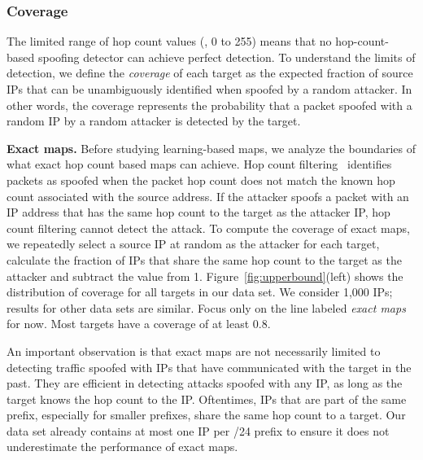 \subsubsection{Coverage}

The limited range of hop count values (\ie{}, 0 to 255) means that no hop-count-based spoofing detector can achieve perfect detection. To understand the limits of detection, we define the {\em coverage} of each target as the expected fraction of source IPs that can be unambiguously identified when spoofed by a random attacker. In other words, the coverage represents the probability that a packet spoofed with a random IP by a random attacker is detected by the target.

{\bf Exact maps.} Before studying learning-based maps, we analyze the boundaries of what exact hop count based maps can achieve. Hop count filtering~\citep{hcf} identifies packets as spoofed when the packet hop count does not match the known hop count associated with the source address. If the attacker spoofs a packet with an IP address that has the same hop count to the target as the attacker IP, hop count filtering cannot detect the attack. 
%
To compute the coverage of exact maps, we repeatedly select a source IP at random as the attacker for each target, calculate the fraction of IPs that share the same hop count to the target as the attacker and subtract the value from 1.
%
Figure~\ref{fig:upperbound}(left) shows the distribution of coverage for all targets in our data set. We consider 1,000 IPs; results for other data sets are similar. Focus only on the line labeled {\em exact maps} for now. Most targets have a coverage of at least 0.8.

An important observation is that exact maps are not necessarily limited to detecting traffic spoofed with IPs that have communicated with the target in the past. They are efficient in detecting attacks spoofed with any IP, as long as the target knows the hop count to the IP. Oftentimes, IPs that are part of the same prefix, especially for smaller prefixes, share the same hop count to a target. Our data set already contains at most one IP per /24 prefix to ensure it does not underestimate the performance of exact maps.

